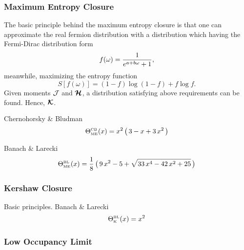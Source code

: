 \subsubsection{Maximum Entropy Closure}
The basic principle behind the maximum entropy closure is that one can approximate the real fermion distribution with a distribution which having the Fermi-Dirac distribution form 
\begin{equation}
f(\omega)=\frac{1}{e^{a + b\omega}+1}, 
\end{equation} 
meanwhile, maximizing the entropy function
\begin{equation}
S[f(\omega)] = (1-f)\log(1-f) + f\log f.
\end{equation} 
Given moments $\mathcal{J}$ and $\boldsymbol{\mathcal{H}}$, a distribution satisfying above requirements can be found. Hence, $\boldsymbol{\mathcal{K}}$.

Chernohorsky \& Bludman \cite{cernohorskyBludman_1994}
\begin{equation}
  \Theta_{\mbox{\tiny ME}}^{\mbox{\tiny CB}}(x)
  =x^{2}\,\big(\,3-x+3\,x^{2}\,\big)
\end{equation}

Banach \& Larecki \cite{banachLarecki_2017b}
\begin{equation}
  \Theta_{\mbox{\tiny ME}}^{\mbox{\tiny BL}}(x)
  =\frac{1}{8}\,\big(\,9\,x^{2}-5+\sqrt{33\,x^{4}-42\,x^{2}+25}\,\big)
\end{equation}

\subsubsection{Kershaw Closure}
Basic principles.  
Banach \& Larecki \cite{banachLarecki_2017a}
\begin{equation}
  \Theta_{\mbox{\tiny K}}^{\mbox{\tiny BL}}(x)=x^{2}
\end{equation}

\subsubsection{Low Occupancy Limit}

